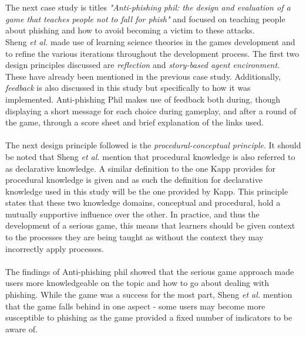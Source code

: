 \documentclass[conference]{IEEEtran}
\begin{document}
\\\\
The next case study is titles \textit{"Anti-phishing phil: the design and evaluation of a game that teaches people not to fall for phish"} and focused on teaching people about phishing and how to avoid becoming a victim to these attacks\cite{Sheng2007}. 
\\
Sheng \textit{et al.}\cite{Sheng2007} made use of learning science theories in the games development and to refine the various iterations throughout the development process. The first two design principles discussed are \textit{reflection} and \textit{story-based agent encironment}\cite{Sheng2007}. These have already been mentioned  in the previous case study. Additionally, \textit{feedback} is also discussed in this study but specifically to how it was implemented. Anti-phishing Phil makes use of feedback both during, though displaying a short message for each choice during gameplay, and after a round of the game, through a score sheet and brief explanation of the links used\cite{Sheng2007}. 
\\\\
The next design principle followed is the \textit{procedural-conceptual principle}\cite{Sheng2007}. It should be noted that Sheng \textit{et al.}\cite{Sheng2007} mention that procedural knowledge is also referred to as declarative knowledge. A similar definition to the one Kapp\cite{Kapp2012a} provides for procedural knowledge is given and as such the definition for declarative knowledge used in this study will be the one provided by Kapp\cite{Kapp2012a}. This principle states that these two knowledge domains, conceptual and procedural, hold a mutually supportive influence over the other\cite{Sheng2007}. In practice, and thus the development of a serious game, this means that learners should be given context to the processes they are being taught as without the context they may incorrectly apply processes\cite{Sheng2007}.
\\\\
The findings of Anti-phishing phil showed that the serious game approach made users more knowledgeable on the topic and how to go about dealing with phishing\cite{Sheng2007}. While the game was a success for the most part, Sheng \textit{et al.}\cite{Sheng2007} mention that the game falls behind in one aspect - some users may become more susceptible to phishing as the game provided a fixed number of indicators to be aware of.
\\\\
\end{document}
